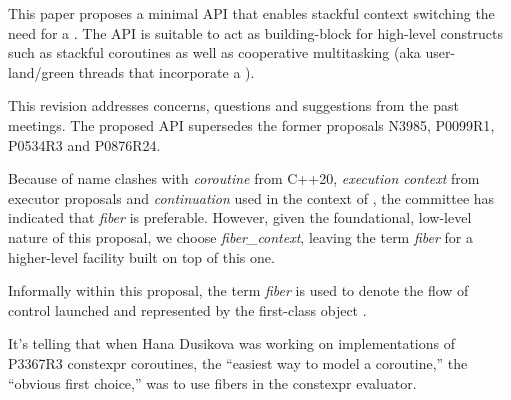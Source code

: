 \label{abstract}

This paper proposes a
minimal API that enables stackful context switching  the need for a
. The API is suitable to act as building-block for high-level
constructs such as stackful coroutines as well as cooperative multitasking
(aka user-land/green threads that incorporate a ).

This revision addresses concerns, questions and suggestions from the past meetings.
The proposed API supersedes the former proposals N3985\cite{N3985},
P0099R1\cite{P0099R1}, P0534R3\cite{P0534R3} and P0876R24\cite{P0876R24}.

Because of name clashes with \emph{coroutine} from C++20,
\emph{execution context} from executor proposals and \emph{continuation} used
in the context of , the committee has indicated
that \emph{fiber} is preferable. However, given the foundational, low-level
nature of this proposal, we choose \emph{fiber\_context}, leaving the
term \emph{fiber} for a higher-level facility built on top of this one.

Informally within this proposal, the term \emph{fiber} is used to denote the
flow of control launched and represented by the first-class object \fiber.

It's telling that when Hana Dusikova was working on implementations of P3367R3
constexpr coroutines\cite{P3367R3}, the ``easiest way to model a coroutine,''
the ``obvious first choice,'' was to use fibers in the constexpr evaluator.
